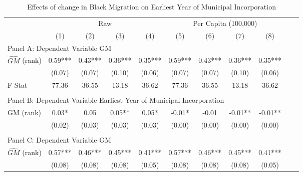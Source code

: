  \begin{table}[htbp]\centering {} \begin{threeparttable} \caption{Effects of change in Black Migration on Earliest Year of Municipal Incorporation} \begin{tabular}{l*{10}{c}} \toprule
                &\multicolumn{4}{c}{Raw}                                    &\multicolumn{4}{c}{Per Capita (100,000)}                   \\\cmidrule(lr){2-5}\cmidrule(lr){6-9}
                &\multicolumn{1}{c}{(1)}   &\multicolumn{1}{c}{(2)}   &\multicolumn{1}{c}{(3)}   &\multicolumn{1}{c}{(4)}   &\multicolumn{1}{c}{(5)}   &\multicolumn{1}{c}{(6)}   &\multicolumn{1}{c}{(7)}   &\multicolumn{1}{c}{(8)}   \\
\cmidrule(lr){1-9}
\multicolumn{8}{l}{Panel A: Dependent Variable GM}\\
\cmidrule(lr){1-9}
$\hat{GM}$ (rank)&       0.59***&       0.43***&       0.36***&       0.35***&       0.59***&       0.43***&       0.36***&       0.35***\\
                &     (0.07)   &     (0.07)   &     (0.10)   &     (0.06)   &     (0.07)   &     (0.07)   &     (0.10)   &     (0.06)   \\
\midrule
F-Stat          &      77.36   &      36.55   &      13.18   &      36.62   &      77.36   &      36.55   &      13.18   &      36.62   \\
\cmidrule[\heavyrulewidth](lr){1-9} \\ \cmidrule[\heavyrulewidth](lr){1-9}
\multicolumn{8}{l}{Panel B: Dependent Variable Earliest Year of Municipal Incorporation}\\
\cmidrule(lr){1-9}
GM  (rank)      &       0.03*  &       0.05   &       0.05** &       0.05*  &      -0.01*  &      -0.01   &      -0.01** &      -0.01** \\
                &     (0.02)   &     (0.03)   &     (0.03)   &     (0.03)   &     (0.00)   &     (0.00)   &     (0.00)   &     (0.00)   \\
\cmidrule[\heavyrulewidth](lr){1-9} \\ \cmidrule[\heavyrulewidth](lr){1-9}
\multicolumn{8}{l}{Panel C: Dependent Variable GM}\\
\cmidrule(lr){1-9}
$\hat{GM}$ (rank)&       0.57***&       0.46***&       0.45***&       0.41***&       0.57***&       0.46***&       0.45***&       0.41***\\
                &     (0.08)   &     (0.08)   &     (0.08)   &     (0.05)   &     (0.08)   &     (0.08)   &     (0.08)   &     (0.05)   \\

\end{tabular}
\end{threeparttable}
\end{table}
